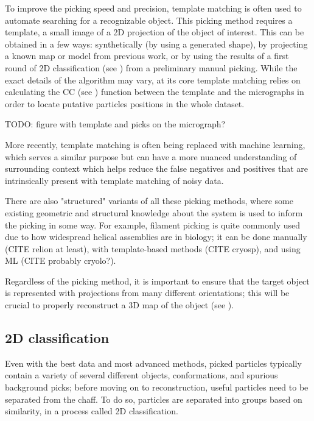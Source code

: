 To improve the picking speed and precision, template matching is often used to automate searching for a recognizable object.
This picking method requires a template, a small image of a 2D projection of the object of interest.
This can be obtained in a few ways: synthetically (by using a generated shape), by projecting a known map or model from previous work, or by using the results of a first round of 2D classification (see ) from a preliminary manual picking.
While the exact details of the algorithm may vary, at its core template matching relies on calculating the CC (see ) function between the template and the micrographs in order to locate putative particles positions in the whole dataset.

TODO: figure with template and picks on the micrograph?

More recently, template matching is often being replaced with machine learning, which serves a similar purpose but can have a more nuanced understanding of surrounding context which helps reduce the false negatives and positives that are intrinsically present with template matching of noisy data.

There are also "structured" variants of all these picking methods, where some existing geometric and structural knowledge about the system is used to inform the picking in some way.
For example, filament picking is quite commonly used due to how widespread helical assemblies are in biology; it can be done manually (CITE relion at least), with template-based methods (CITE cryosp), and using ML (CITE probably cryolo?).

Regardless of the picking method, it is important to ensure that the target object is represented with projections from many different orientations; this will be crucial to properly reconstruct a 3D map of the object (see ).

\subsection{2D classification}\label{classification}

Even with the best data and most advanced methods, picked particles typically contain a variety of several different objects, conformations, and spurious background picks; before moving on to reconstruction, useful particles need to be separated from the chaff.
To do so, particles are separated into groups based on similarity, in a process called 2D classification.

